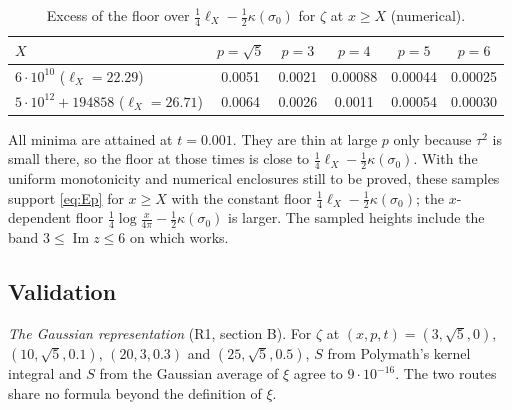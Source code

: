 \documentclass[11pt]{article}
\theoremstyle{definition}
\theoremstyle{remark}
\newcommand{\im}{\operatorname{Im}}
\numberwithin{equation}{section}
\begin{document}
\begin{table}[ht]
\centering\small
\begin{tabular}{@{}lccccc@{}}
\toprule
$X$ & $p=\sqrt5$ & $p=3$ & $p=4$ & $p=5$ & $p=6$\\
\midrule
$6\cdot10^{10}$ ($\ell_X=22.29$) & 0.0051 & 0.0021 & 0.00088 & 0.00044 & 0.00025\\
$5\cdot10^{12}+194858$ ($\ell_X=26.71$) & 0.0064 & 0.0026 & 0.0011 & 0.00054 & 0.00030\\
\bottomrule
\end{tabular}
\caption{Excess of the floor over $\frac14\ell_X-\frac12\kappa(\sigma_0)$ for $\zeta$ at $x\ge X$ (numerical).}\label{tab:zetaX}
\end{table}

All minima are attained at $t=0.001$. They are thin at large $p$ only
because $\tau^2$ is small there, so the floor at those times is close to
$\frac14\ell_X-\frac12\kappa(\sigma_0)$. With the uniform monotonicity and numerical enclosures still to be
proved, these samples support \eqref{eq:Ep} for $x\ge X$ with the constant floor
$\frac14\ell_X-\frac12\kappa(\sigma_0)$; the $x$-dependent floor
$\frac14\log\frac x{4\pi}-\frac12\kappa(\sigma_0)$ is larger. The sampled
heights include the band $3\le\im z\le6$ on which \cite{hb} works.

\subsection{Validation}\label{sec:validation}

\emph{The Gaussian representation} (R1, section B). For $\zeta$ at
$(x,p,t)=(3,\sqrt5,0)$, $(10,\sqrt5,0.1)$, $(20,3,0.3)$ and $(25,\sqrt5,0.5)$,
$S$ from Polymath's kernel integral and $S$ from the Gaussian average of
$\xi$ agree to $9\cdot10^{-16}$. The two routes share no formula beyond the
definition of $\xi$.
\end{document}
